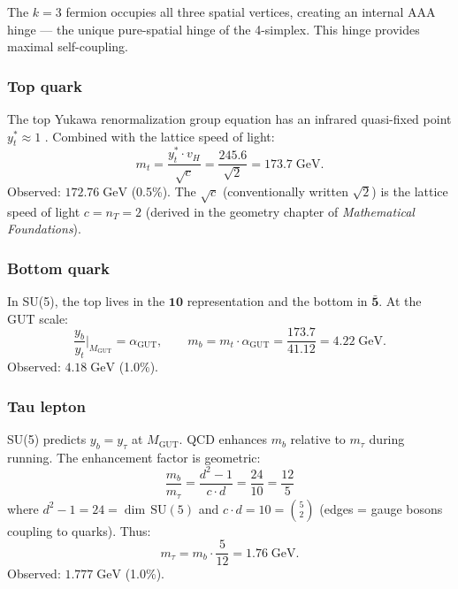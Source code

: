 \documentclass[12pt]{article}
\theoremstyle{remark}
\theoremstyle{definition}
\begin{document}
The $k = 3$ fermion occupies all three spatial vertices, creating an internal AAA hinge --- the unique pure-spatial hinge of the 4-simplex. This hinge provides maximal self-coupling.

\subsubsection{Top quark}

The top Yukawa renormalization group equation has an infrared quasi-fixed point $y^*_t \approx 1$ \cite{Pendleton, Hill}. Combined with the lattice speed of light:
\begin{equation}
m_t = \frac{y^*_t \cdot v_H}{\sqrt{c}} = \frac{245.6}{\sqrt{2}} = 173.7\;\text{GeV}.
\end{equation}
Observed: $172.76\;\text{GeV}$ (0.5\%). The $\sqrt{c}$ (conventionally written $\sqrt{2}$) is the lattice speed of light $c = n_T = 2$ (derived in the geometry chapter of \textit{Mathematical Foundations}).

\subsubsection{Bottom quark}

In SU(5), the top lives in the $\mathbf{10}$ representation and the bottom in $\bar{\mathbf{5}}$. At the GUT scale:
\begin{equation}
\frac{y_b}{y_t}\bigg|_{M_\text{GUT}} = \alpha_\text{GUT}, \qquad m_b = m_t \cdot \alpha_\text{GUT} = \frac{173.7}{41.12} = 4.22\;\text{GeV}.
\end{equation}
Observed: $4.18\;\text{GeV}$ (1.0\%).

\subsubsection{Tau lepton}

SU(5) predicts $y_b = y_\tau$ at $M_\text{GUT}$. QCD enhances $m_b$ relative to $m_\tau$ during running. The enhancement factor is geometric:
\begin{equation}
\frac{m_b}{m_\tau} = \frac{d^2 - 1}{c \cdot d} = \frac{24}{10} = \frac{12}{5}
\end{equation}
where $d^2 - 1 = 24 = \dim\,\text{SU}(5)$ and $c \cdot d = 10 = \binom{5}{2}$ (edges = gauge bosons coupling to quarks). Thus:
\begin{equation}
m_\tau = m_b \cdot \frac{5}{12} = 1.76\;\text{GeV}.
\end{equation}
Observed: $1.777\;\text{GeV}$ (1.0\%).
\end{document}

